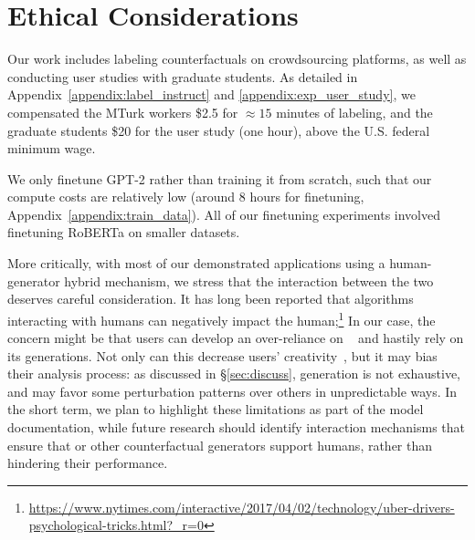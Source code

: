 
\section{Ethical Considerations}
Our work includes labeling counterfactuals on crowdsourcing platforms, as well as conducting user studies with graduate students.
As detailed in Appendix~\ref{appendix:label_instruct} and \ref{appendix:exp_user_study}, we compensated the MTurk workers \$2.5 for ${\approx}15$ minutes of labeling, and the graduate students \$20 for the user study (one hour), above the U.S. federal minimum wage.

We only finetune GPT-2 rather than training it from scratch, such that our compute costs are relatively low (around 8 hours for finetuning, Appendix~\ref{appendix:train_data}). All of our finetuning experiments involved finetuning RoBERTa on smaller datasets.

More critically, with most of our demonstrated applications using a human-generator hybrid mechanism, we stress that the interaction between the two deserves careful consideration.
It has long been reported that algorithms interacting with humans can negatively impact the human;\footnote{\url{https://www.nytimes.com/interactive/2017/04/02/technology/uber-drivers-psychological-tricks.html?_r=0}}
In our case, the concern might be that users can develop an over-reliance on \sysname~\cite{bansal2021does} and hastily rely on its generations.
Not only can this decrease users' creativity~\cite{green-etal-2014-human}, but it may bias their analysis process: as discussed in \S\ref{sec:discuss}, \sysname generation is not exhaustive, and may favor some perturbation patterns over others in unpredictable ways.
In the short term, we plan to highlight these limitations as part of the model documentation, while future research should identify interaction mechanisms that ensure that \sysname or other counterfactual generators support humans, rather than hindering their performance.



